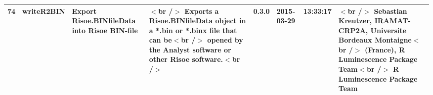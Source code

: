 \begin{table}[ht]
\begin{tabular}{rlllllll}
  74 & writeR2BIN & Export Risoe.BINfileData into Risoe BIN-file & $<$br /$>$ Exports a Risoe.BINfileData object in a *.bin or *.binx file that can be$<$br /$>$ opened by the Analyst software or other Risoe software.$<$br /$>$ & 0.3.0 & 2015-03-29 & 13:33:17 & $<$br /$>$ Sebastian Kreutzer, IRAMAT-CRP2A, Universite Bordeaux Montaigne$<$br /$>$ (France),   R Luminescence Package Team$<$br /$>$  R Luminescence Package Team \\ 
   \hline
\end{tabular}
\end{table}

